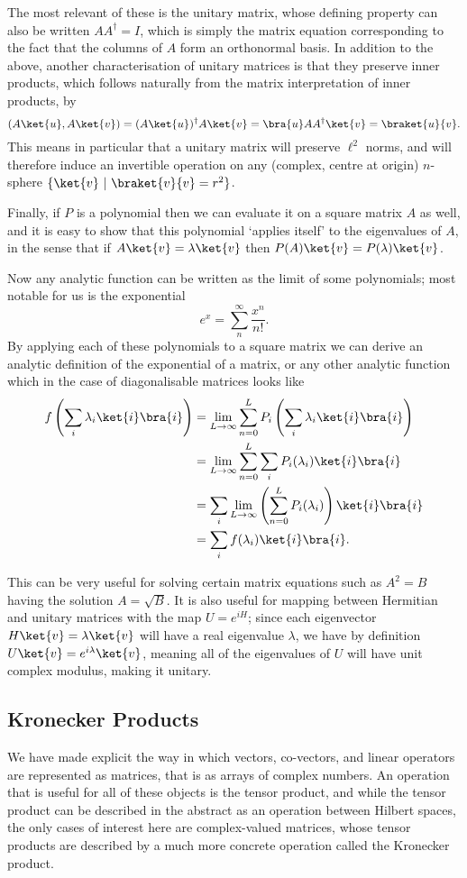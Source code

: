 The most relevant of these is the unitary matrix, whose defining property can also be written $AA^\dagger = I$, which is simply the matrix equation corresponding to the fact that the columns of $A$ form an orthonormal basis. In addition to the above, another characterisation of unitary matrices is that they preserve inner products, which follows naturally from the matrix interpretation of inner products, by
\[(A\ket{u}, A\ket{v}) = (A\ket{u})^\dagger A\ket{v} = \bra{u}AA^\dagger \ket{v} = \braket{u}{v}.\]
This means in particular that a unitary matrix will preserve $\ell^2$ norms, and will therefore induce an invertible operation on any (complex, centre at origin) $n$-sphere $\{\ket{v}\ |\ \braket{v}{v} = r^2\}$.

Finally, if $P$ is a polynomial then we can evaluate it on a square matrix $A$ as well, and it is easy to show that this polynomial `applies itself' to the eigenvalues of $A$, in the sense that if $A\ket{v} = \lambda\ket{v}$ then $P(A)\ket{v} = P(\lambda)\ket{v}$.

Now any analytic function can be written as the limit of some polynomials; most notable for us is the exponential
\[e^x = \sum_n^\infty \frac{x^n}{n!}.\]
By applying each of these polynomials to a square matrix we can derive an analytic definition of the exponential of a matrix, or any other analytic function which in the case of diagonalisable matrices looks like
\begin{align*}
	f\left(\sum_i \lambda_i\ket{i}\bra{i}\right)
	&= \lim_{L \to \infty} \sum_{n=0}^L P_i\left(\sum_i \lambda_i\ket{i}\bra{i}\right)
	\\&= \lim_{L \to \infty} \sum_{n=0}^L \sum_i P_i(\lambda_i)\ket{i}\bra{i}
	\\&= \sum_i \lim_{L \to \infty} \left(\sum_{n=0}^L  P_i(\lambda_i)\right)\ket{i}\bra{i}
	\\&= \sum_i f(\lambda_i)\ket{i}\bra{i}.
\end{align*}

This can be very useful for solving certain matrix equations such as $A^2 = B$ having the solution $A = \sqrt{B}$. It is also useful for mapping between Hermitian and unitary matrices with the map $U = e^{iH}$; since each eigenvector $H\ket{v} = \lambda\ket{v}$ will have a real eigenvalue $\lambda$, we have by definition $U\ket{v} = e^{i\lambda}\ket{v}$, meaning all of the eigenvalues of $U$ will have unit complex modulus, making it unitary.

\subsection{Kronecker Products}
We have made explicit the way in which vectors, co-vectors, and linear operators are represented as matrices, that is as arrays of complex numbers. An operation that is useful for all of these objects is the tensor product, and while the tensor product can be described in the abstract as an operation between Hilbert spaces, the only cases of interest here are complex-valued matrices, whose tensor products are described by a much more concrete operation called the Kronecker product.

